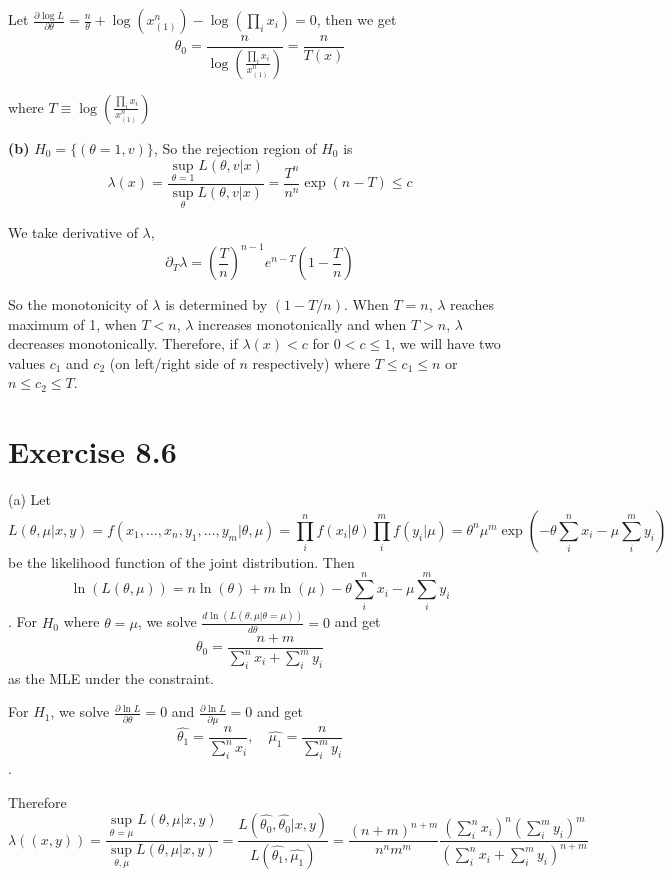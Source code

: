 \documentclass[12pt]{article}
\begin{document}
Let $\frac{\partial \log L}{\partial \theta} = \frac{n}{\theta} + \log(x_{(1)}^n) - \log(\prod_i x_i) = 0$, then we get $$\theta_0 = \frac{n}{\log \left( \frac{ \prod_i x_i}{x_{(1)}^n}\right)} = \frac{n}{T(x)}$$

where $T \equiv  \log \left( \frac{ \prod_i x_i}{x_{(1)}^n}\right)$

\textbf{(b)} $H_0 = \{(\theta = 1, v)\}$,
So the rejection region of $H_0$ is $$\lambda(x) = \frac{\sup_{\theta=1} L(\theta, v| x)}{\sup_{\theta} L(\theta, v | x)} = \frac{T^n}{n^n}\exp(n - T) \leq c$$ 

We take derivative of $\lambda$,  $$\partial_{T}\lambda = \left(\frac{T}{n}\right)^{n-1} e^{n-T} \left( 1- \frac{T}{n} \right)$$ 

So the monotonicity of $\lambda$ is determined by $(1 - T/n)$. When $T = n$, $\lambda$ reaches maximum of 1, when $T < n$, $\lambda$ increases monotonically and when $T > n$, $\lambda$ decreases monotonically. Therefore, if $\lambda(x) < c$ for $0 < c \leq 1$, we will have two values $c_1$ and $c_2$ (on left/right side of $n$ respectively) where $T \leq c_1 \leq n$ or $n \leq c_2 \leq T$.

\section*{Exercise 8.6}
(a) Let $$L(\theta, \mu|x, y) = f(x_1, \ldots, x_n, y_1, \ldots, y_m | \theta, \mu) = \prod_i^n f(x_i|\theta) \prod_i^m f(y_i|\mu) = \theta^n \mu^m \exp(-\theta \sum_i^n x_i - \mu \sum_i^m y_i)$$ be the likelihood function of the joint distribution. Then 
$$ \ln(L(\theta, \mu)) = n\ln(\theta) + m \ln(\mu) -\theta \sum_i^n x_i - \mu \sum_i^m y_i$$.
For $H_0$ where $\theta = \mu$, we solve $\frac{d\ln(L(\theta, \mu | \theta = \mu))}{d\theta} =0$ and get $$\hat{\theta_0} = \frac{n+m}{\sum_i^n x_i + \sum_i^m y_i}$$ as the MLE under the constraint.

For $H_1$,  we solve $\frac{\partial \ln L}{\partial \theta} = 0$ and $\frac{\partial \ln L }{\partial \mu} = 0$ and get $$\hat{\theta_1} = \frac{n}{\sum_i^n x_i},  \quad \hat{\mu_1} = \frac{n}{\sum_i^m y_i}$$.

Therefore $$\lambda((x, y)) = \frac{\sup_{\theta=\mu} L(\theta, \mu|x, y)}{\sup_{\theta, \mu} L(\theta, \mu|x, y)} = \frac{ L(\hat{\theta_0}, \hat{\theta_0}|x, y)}{L(\hat{\theta_1}, \hat{\mu_1})} = \frac{(n+m)^{n+m}}{n^nm^m}\frac{\left(\sum_i^nx_i\right)^n \left(\sum_i^m y_i\right)^m}{\left(\sum_i^nx_i +  \sum_i^m y_i \right)^{n+m}}$$
\end{document}
